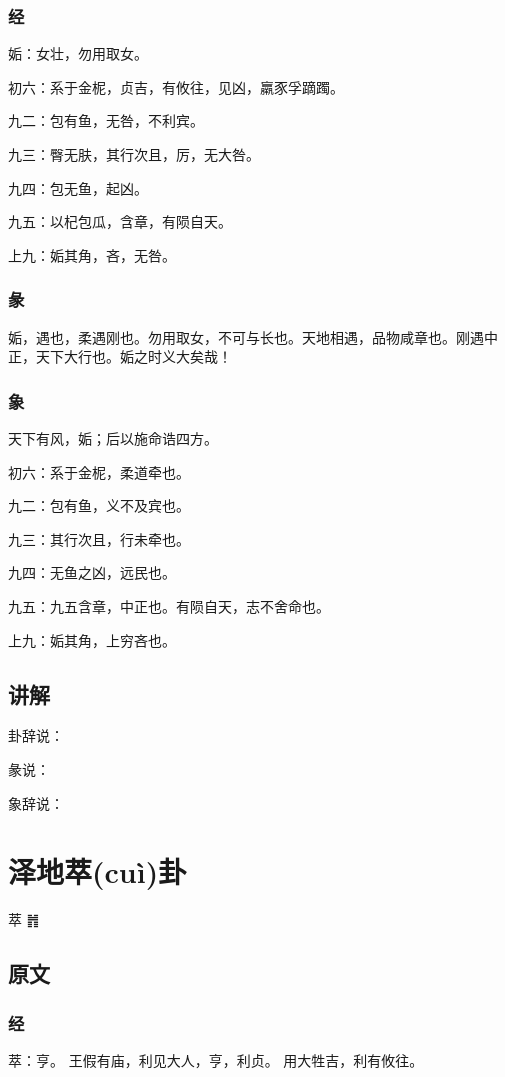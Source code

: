 \documentclass[12pt,oneside]{book}
\begin{document}
\subsection{经}
姤：女壮，勿用取女。

初六：系于金柅，贞吉，有攸往，见凶，羸豕孚蹢躅。

九二：包有鱼，无咎，不利宾。

九三：臀无肤，其行次且，厉，无大咎。

九四：包无鱼，起凶。

九五：以杞包瓜，含章，有陨自天。

上九：姤其角，吝，无咎。


\subsection{彖}
姤，遇也，柔遇刚也。勿用取女，不可与长也。天地相遇，品物咸章也。刚遇中正，天下大行也。姤之时义大矣哉！

\subsection{象}
天下有风，姤；后以施命诰四方。

初六：系于金柅，柔道牵也。

九二：包有鱼，义不及宾也。

九三：其行次且，行未牵也。

九四：无鱼之凶，远民也。

九五：九五含章，中正也。有陨自天，志不舍命也。

上九：姤其角，上穷吝也。


\section{讲解}
卦辞说：

彖说：

象辞说：


\chapter{泽地萃(cuì)卦}
萃 {\Large ䷬}
\section{原文}

\subsection{经}
萃：亨。 王假有庙，利见大人，亨，利贞。 用大牲吉，利有攸往。
\end{document}
